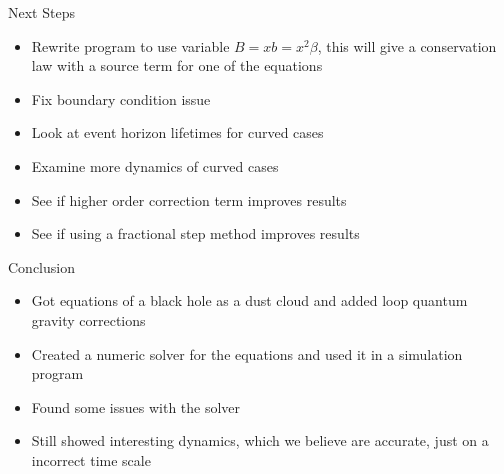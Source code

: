 \documentclass[12pt]{beamer}
\begin{document}
\begin{frame}{Next Steps}
    \begin{itemize}
        \item Rewrite program to use variable $B = xb = x^2\beta$, this will give a
            conservation law with a source term for one of the equations
        \item Fix boundary condition issue
        \item Look at event horizon lifetimes for curved cases
        \item Examine more dynamics of curved cases
        \item See if higher order correction term improves results
        \item See if using a fractional step method improves results
    \end{itemize}
\end{frame}

\begin{frame}{Conclusion}
    \begin{itemize}
        \item Got equations of a black hole as a dust cloud and added loop quantum
            gravity corrections
        \item Created a numeric solver for the equations and used it in a simulation
            program
        \item Found some issues with the solver
        \item Still showed interesting dynamics, which we believe are accurate, just on
            a incorrect time scale
    \end{itemize}
\end{frame}
\end{document}
